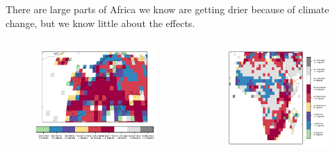 \documentclass[9pt]{beamer}
\begin{document}
\begin{frame}{There are large parts of Africa we know are getting drier because of climate change, but we know little about the effects.}

\begin{columns}
	\begin{column}{0.6\linewidth}
		\begin{figure}
			\includegraphics[width=\linewidth]{../plots/maps/gridcells_da_studies_precip_2_5_Europe.png}
		\end{figure}
	\end{column}
	\begin{column}{0.4\linewidth}
		\begin{figure}
			\includegraphics[width=\linewidth]{../plots/maps/gridcells_da_studies_precip_2_5_Africa.png}
		\end{figure}
	\end{column}
\end{columns}


\end{frame}
\end{document}

